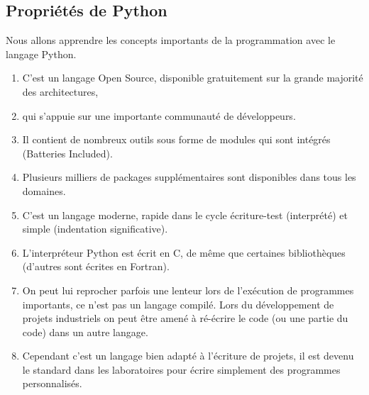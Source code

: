 \subsection{Propriétés de Python}
Nous allons apprendre les concepts importants de la programmation avec le langage Python.
\begin{enumerate}
\item C'est un langage Open Source, disponible gratuitement sur la grande majorité des architectures,
\item  qui s'appuie sur une importante communauté de développeurs.
\item Il contient de nombreux outils sous forme de modules qui sont intégrés  (Batteries Included).
\item Plusieurs milliers de packages supplémentaires sont disponibles dans tous les domaines.
\item C'est un langage moderne, rapide dans le cycle écriture-test (interprété) et simple (indentation significative).
\item L'interpréteur Python est écrit en C, de même que certaines bibliothèques (d'autres sont écrites en Fortran).
\item On peut lui reprocher parfois une lenteur lors de l'exécution de programmes importants, ce n'est pas un langage compilé. Lors du développement de projets industriels on peut être amené à ré-écrire le code (ou une partie du code) dans un autre langage.
\item Cependant c'est un langage bien adapté à l'écriture de projets, il est devenu le standard dans les laboratoires pour écrire simplement des programmes personnalisés.
\end{enumerate}

